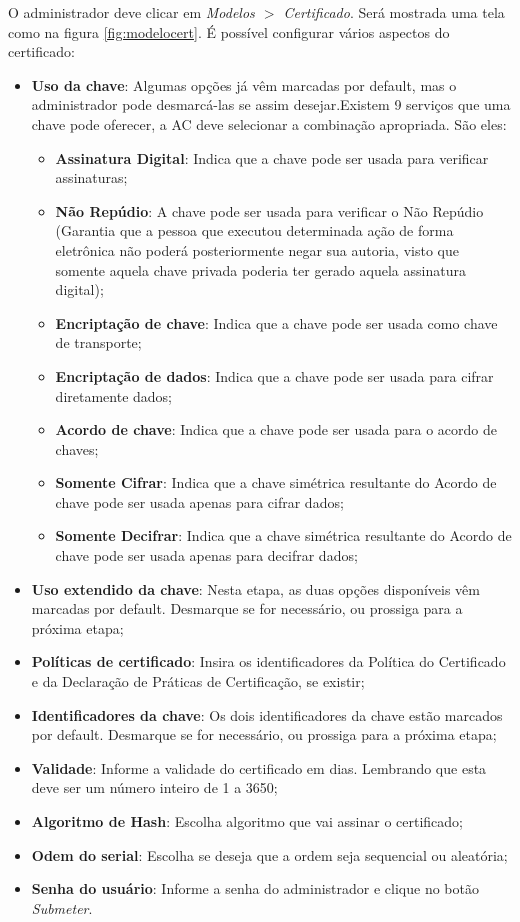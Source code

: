 O administrador deve clicar em \textit{Modelos $>$ Certificado}. Será mostrada uma tela como na figura \ref{fig:modelocert}. É possível configurar vários aspectos do certificado:

\begin{itemize}
	\item \textbf{Uso da chave}: Algumas opções já vêm marcadas por default, mas o administrador pode desmarcá-las se assim desejar.Existem 9 serviços que uma chave pode oferecer, a AC deve selecionar a combinação apropriada. São eles:
    \begin{itemize}
        \item \textbf{Assinatura Digital}: Indica que a chave pode ser usada para verificar assinaturas;
        \item \textbf{Não Repúdio}: A chave pode ser usada para verificar o Não Repúdio (Garantia que a pessoa que executou determinada ação de forma eletrônica não poderá posteriormente negar sua autoria, visto que somente aquela chave privada poderia ter gerado aquela assinatura digital);
        \item \textbf{Encriptação de chave}: Indica que a chave pode ser usada como chave de transporte;
        \item \textbf{Encriptação de dados}: Indica que a chave pode ser usada para cifrar diretamente dados;
        \item \textbf{Acordo de chave}: Indica que a chave pode ser usada para o acordo de chaves;
        \item \textbf{Somente Cifrar}: Indica que a chave simétrica resultante do Acordo de chave pode ser usada apenas para cifrar dados;
        \item \textbf{Somente Decifrar}: Indica que a chave simétrica resultante do Acordo de chave pode ser usada apenas para decifrar dados;
    \end{itemize}
	\item \textbf{Uso extendido da chave}: Nesta etapa, as duas opções disponíveis vêm marcadas por default. Desmarque se for necessário, ou prossiga para a próxima etapa;
	\item \textbf{Políticas de certificado}: Insira os identificadores da Política do Certificado e da Declaração de Práticas de Certificação, se existir;
	\item \textbf{Identificadores da chave}: Os dois identificadores da chave estão marcados por default. Desmarque se for necessário, ou prossiga para a próxima etapa;
	\item \textbf{Validade}: Informe a validade do certificado em dias. Lembrando que esta deve ser um número inteiro de 1 a 3650;
	\item \textbf{Algoritmo de Hash}: Escolha algoritmo que vai assinar o certificado;
	\item \textbf{Odem do serial}: Escolha se deseja que a ordem seja sequencial ou aleatória;
	\item \textbf{Senha do usuário}: Informe a senha do administrador e clique no botão \emph{Submeter}.
\end{itemize}

